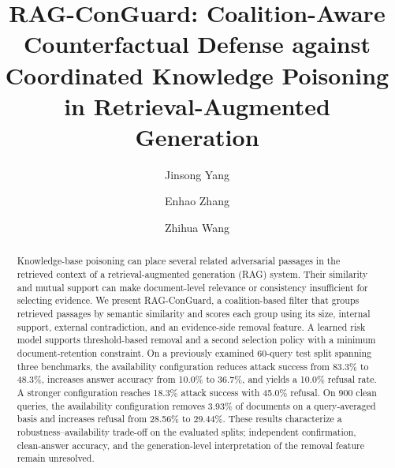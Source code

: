 \documentclass[sigconf]{acmart}
\begin{document}
\title[RAG-ConGuard: Coalition-Aware Counterfactual Defense]{RAG-ConGuard: Coalition-Aware Counterfactual Defense against Coordinated Knowledge Poisoning in Retrieval-Augmented Generation}

\author{Jinsong Yang}

\author{Enhao Zhang}

\author{Zhihua Wang}

\renewcommand{\shortauthors}{Yang et al.}

\begin{abstract}
Knowledge-base poisoning can place several related adversarial passages in the retrieved context of a retrieval-augmented generation (RAG) system. Their similarity and mutual support can make document-level relevance or consistency insufficient for selecting evidence. We present RAG-ConGuard, a coalition-based filter that groups retrieved passages by semantic similarity and scores each group using its size, internal support, external contradiction, and an evidence-side removal feature. A learned risk model supports threshold-based removal and a second selection policy with a minimum document-retention constraint. On a previously examined 60-query test split spanning three benchmarks, the availability configuration reduces attack success from 83.3\% to 48.3\%, increases answer accuracy from 10.0\% to 36.7\%, and yields a 10.0\% refusal rate. A stronger configuration reaches 18.3\% attack success with 45.0\% refusal. On 900 clean queries, the availability configuration removes 3.93\% of documents on a query-averaged basis and increases refusal from 28.56\% to 29.44\%. These results characterize a robustness--availability trade-off on the evaluated splits; independent confirmation, clean-answer accuracy, and the generation-level interpretation of the removal feature remain unresolved.
\end{abstract}
\end{document}
